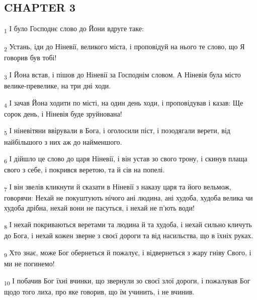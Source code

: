 \subsection{CHAPTER 3}
\begin{tcolorbox}
\textsubscript{1} І було Господнє слово до Йони вдруге таке:
\end{tcolorbox}
\begin{tcolorbox}
\textsubscript{2} Устань, іди до Ніневії, великого міста, і проповідуй на нього те слово, що Я говорив був тобі!
\end{tcolorbox}
\begin{tcolorbox}
\textsubscript{3} І Йона встав, і пішов до Ніневії за Господнім словом. А Ніневія була місто велике-превелике, на три дні ходи.
\end{tcolorbox}
\begin{tcolorbox}
\textsubscript{4} І зачав Йона ходити по місті, на один день ходи, і проповідував і казав: Ще сорок день, і Ніневія буде зруйнована!
\end{tcolorbox}
\begin{tcolorbox}
\textsubscript{5} І ніневітяни ввірували в Бога, і оголосили піст, і позодягали верети, від найбільшого з них аж до найменшого.
\end{tcolorbox}
\begin{tcolorbox}
\textsubscript{6} І дійшло це слово до царя Ніневії, і він устав зо свого трону, і скинув плаща свого з себе, і покрився веретою, та й сів на попелі.
\end{tcolorbox}
\begin{tcolorbox}
\textsubscript{7} І він звелів кликнути й сказати в Ніневії з наказу царя та його вельмож, говорячи: Нехай не покуштують нічого ані людина, ані худоба, худоба велика чи худоба дрібна, нехай вони не пасуться, і нехай не п'ють води!
\end{tcolorbox}
\begin{tcolorbox}
\textsubscript{8} І нехай покриваються веретами та людина й та худоба, і нехай сильно кличуть до Бога, і нехай кожен зверне з своєї дороги та від насильства, що в їхніх руках.
\end{tcolorbox}
\begin{tcolorbox}
\textsubscript{9} Хто знає, може Бог обернеться й пожалує, і відвернеться з жару гніву Свого, і ми не погинемо!
\end{tcolorbox}
\begin{tcolorbox}
\textsubscript{10} І побачив Бог їхні вчинки, що звернули зо своєї злої дороги, і пожалував Бог щодо того лиха, про яке говорив, що їм учинить, і не вчинив.
\end{tcolorbox}
